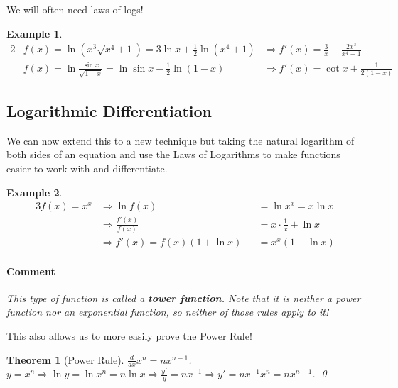\documentclass[letterpaper, 11pt, openany]{book}
\theoremstyle{mytheoremstyle}
\newtheorem{theorem}{Theorem}[section]
\renewenvironment{proof}{{\par \sffamily \smaller \fontseries{b}\selectfont Proof}}{\hfill\qed}
\theoremstyle{myexamplestyle}
\newtheorem{example}{Example}[section]
\newenvironment{commentary}{\paragraph{\sffamily \smaller \fontseries{b}\selectfont Comment}}{}
\begin{document}
We will often need laws of logs!

\begin{example}\label{e:laws-of-logs}
    \begin{alignat*}{2}
        &f(x) = \ln \left(x^{3}\sqrt{x^{4} + 1}\right) = 3\ln x + \frac{1}{2} \ln (x^{4} + 1) &\Rightarrow f'(x) = \frac{3}{x} + \frac{2x^{3}}{x^{4}  + 1}\\
        &f(x) = \ln \frac{\sin x}{\sqrt{1-x}} = \ln \sin x - \frac{1}{2} \ln (1-x) &\Rightarrow f'(x) = \cot x + \frac{1}{2(1-x)}
    \end{alignat*}
\end{example}

\subsection{Logarithmic Differentiation}

We can now extend this to a new technique but taking the natural logarithm of both sides of an equation and use the Laws of Logarithms to make functions easier to work with and differentiate.

\begin{example}\label{e:log-diff-tower-function}
    \begin{alignat*}{3}
        f(x) = x^{x} &\Rightarrow \ln f(x) &&= \ln x^{x} = x\ln x\\
                    &\Rightarrow \frac{f'(x)}{f(x)} &&= x\cdot \frac{1}{x} + \ln x\\  
                    &\Rightarrow f'(x) = f(x) \left(1 + \ln x\right) &&= x^{x}\left(1 + \ln x\right) 
    \end{alignat*}
    \begin{commentary}
        This type of function is called a \textbf{tower function}. Note that it is neither a power function nor an exponential function, so neither of those rules apply to it!
    \end{commentary}
\end{example}

This also allows us to more easily prove the Power Rule!

\begin{theorem}[Power Rule]\label{t:power-rule}
    \(\frac{d}{dx} x^{n} = nx^{n-1}\).
    \begin{proof}
        \(y = x^{n} \Rightarrow \ln y = \ln x^{n} = n\ln x \Rightarrow \frac{y'}{y} = nx^{-1} \Rightarrow y' = nx^{-1}x^{n} = nx^{n-1}\).
    \end{proof}
\end{theorem}
\end{document}
